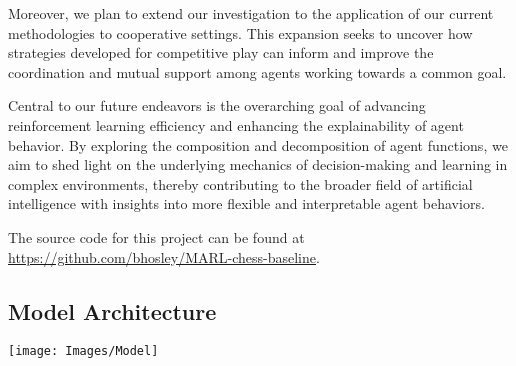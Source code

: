 \documentclass[journal]{IEEEtran}
\begin{document}
		Moreover, we plan to extend our investigation to the application of our current methodologies to cooperative settings. 
		This expansion seeks to uncover how strategies developed for competitive play can inform and 
		improve the coordination and mutual support among agents working towards a common goal.
	
		Central to our future endeavors is the overarching goal of advancing reinforcement learning efficiency 
		and enhancing the explainability of agent behavior. 
		By exploring the composition and decomposition of agent functions, 
		we aim to shed light on the underlying mechanics of decision-making and learning in complex environments, 
		thereby contributing to the broader field of artificial intelligence with insights into more flexible and interpretable agent behaviors.
		
		
		The source code for this project can be found at  \href{https://github.com/bhosley/MARL-chess-baseline}{https://github.com/bhosley/MARL-chess-baseline}.
		
	\begin{comment}
		
	\end{comment}
	
		
	\label{sec:references}
	
	
	
	\clearpage
	\begin{appendices}
		
	\section{Model Architecture}
	\label{appendix:model}
	\begin{center}
		\texttt{[image: Images/Model]}
	\end{center}
	
	\end{appendices}
	
\end{document}
